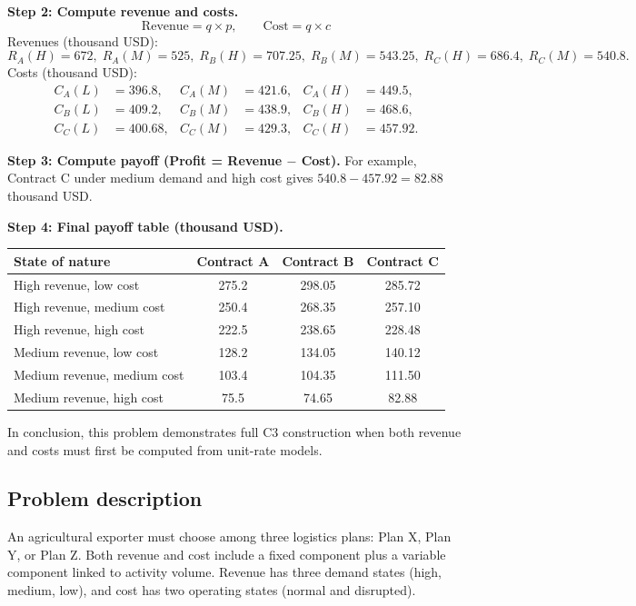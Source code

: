 \begin{ExamProblems}
		\textbf{Step 2: Compute revenue and costs.}
		\[
		\text{Revenue}=q\times p, \qquad \text{Cost}=q\times c
		\]
		Revenues (thousand USD):
		\[
		R_A(H)=672,\; R_A(M)=525,\; R_B(H)=707.25,\; R_B(M)=543.25,\; R_C(H)=686.4,\; R_C(M)=540.8.
		\]
		Costs (thousand USD):
		\[
		\begin{aligned}
		C_A(L)&=396.8, & C_A(M)&=421.6, & C_A(H)&=449.5,\\
		C_B(L)&=409.2, & C_B(M)&=438.9, & C_B(H)&=468.6,\\
		C_C(L)&=400.68, & C_C(M)&=429.3, & C_C(H)&=457.92.
		\end{aligned}
		\]
		
		\textbf{Step 3: Compute payoff (Profit = Revenue $-$ Cost).}
		For example, Contract C under medium demand and high cost gives
		\(540.8-457.92=82.88\) thousand USD.
		
		\textbf{Step 4: Final payoff table (thousand USD).}
		\begin{center}
			\begin{tabular}{l c c c}
				\toprule
				State of nature & Contract A & Contract B & Contract C \\
				\midrule
				High revenue, low cost & 275.2 & 298.05 & 285.72 \\
				High revenue, medium cost & 250.4 & 268.35 & 257.10 \\
				High revenue, high cost & 222.5 & 238.65 & 228.48 \\
				Medium revenue, low cost & 128.2 & 134.05 & 140.12 \\
				Medium revenue, medium cost & 103.4 & 104.35 & 111.50 \\
				Medium revenue, high cost & 75.5 & 74.65 & 82.88 \\
				\bottomrule
			\end{tabular}
		\end{center}
		
		In conclusion, this problem demonstrates full C3 construction when both revenue and costs must first be computed from unit-rate models.
		
		\item
		\subsection*{Problem description}
		An agricultural exporter must choose among three logistics plans: Plan X, Plan Y, or Plan Z.
		Both revenue and cost include a fixed component plus a variable component linked to activity volume.
		Revenue has three demand states (high, medium, low), and cost has two operating states (normal and disrupted).
		

\end{ExamProblems}
